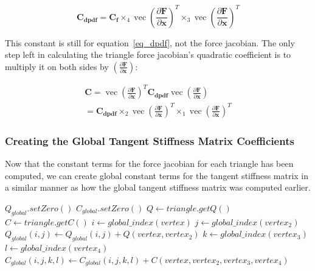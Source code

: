 \documentclass[twocolumn,10pt]{asme2ej}
\DeclareMathOperator{\vect}{vec}
\begin{document}
\begin{equation}
\bm{C_{dpdf}}  = \bm{C_f} \times_4 \vect \left( \frac{\partial \bm{F}}{\partial \bm{x}} \right)^T \times_3 \vect \left( \frac{\partial \bm{F}}{\partial \bm{x}}\right)^T
\end{equation}

This constant is still for equation~\ref{eq_dpdf}, not the force jacobian. The only step left in calculating the triangle force jacobian's quadratic coefficient is to multiply it on both sides by $\left(\frac{\partial \bm{F}}{\partial \bm{x}}\right)$:

\begin{multline}
\bm{C}  = \vect \left( \frac{\partial \bm{F}}{\partial \bm{x}} \right)^T \bm{C_{dpdf}} \vect \left( \frac{\partial \bm{F}}{\partial \bm{x}} \right)
\\ = \bm{C_{dpdf}} \times_2 \vect \left( \frac{\partial \bm{F}}{\partial \bm{x}} \right)^T \times_1 \vect \left( \frac{\partial \bm{F}}{\partial \bm{x}}\right)^T
\end{multline}

\subsubsection{Creating the Global Tangent Stiffness Matrix Coefficients}

Now that the constant terms for the force jacobian for each triangle has been computed, we can create global constant terms for the tangent stiffness matrix in a similar manner as how the global tangent stiffness matrix was computed earlier.

\begin{algorithmic}[1]
        \State $Q_{global}.setZero()$
        \State $C_{global}.setZero()$
         \State $Q \gets triangle.getQ()$
         \State $C \gets triangle.getC()$
                  \State $i \gets global\_index(vertex)$
                          \State $j \gets global\_index(vertex_2)$
                          \State $Q_{global}(i,j) \gets Q_{global}(i,j) + Q(vertex, vertex_2)$
                                \State $k \gets global\_index(vertex_3)$
                                    \State $l \gets global\_index(vertex_4)$
                                    \State $C_{global}(i,j,k,l)  \gets C_{global}(i,j,k,l)+C(vertex, vertex_2, vertex_3, vertex_4)$
                                  \EndFor
                            \EndFor
                      \EndIf
                    \EndFor
              \EndIf
            \EndFor
        \EndFor
    \EndFunction
\end{algorithmic}
\end{document}
